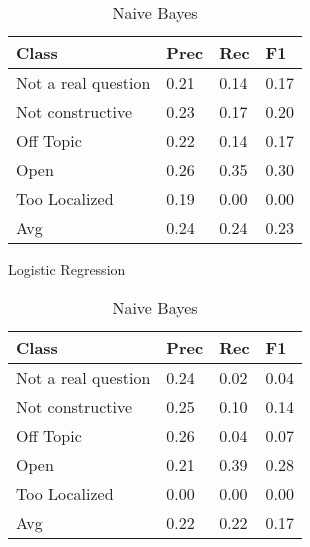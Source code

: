 \begin{table}[!htpb]
\centering
\begin{minipage}{.5\linewidth}
    \begin{tabular}{|l|l|l|l|} \hline
    \textbf{Class}& \textbf{Prec} & \textbf{Rec} & \textbf{F1} \\ \hline
    Not a real question & 0.21      & 0.14   & 0.17    \\
    Not constructive    & 0.23      & 0.17   & 0.20     \\
    Off Topic           & 0.22      & 0.14   & 0.17     \\
    Open                & 0.26      & 0.35   & 0.30     \\
    Too Localized       & 0.19      & 0.00   & 0.00     \\ \hline
    Avg                 & 0.24      & 0.24   & 0.23   \\ \hline  
    \end{tabular}
    \caption{Logistic Regression}
    \label{tab1:lr}
\end{minipage}%
\begin{minipage}{.5\linewidth}
    \begin{tabular}{|l|l|l|l|} \hline
    \textbf{Class}& \textbf{Prec} & \textbf{Rec} & \textbf{F1} \\ \hline
    Not a real question & 0.24      & 0.02   & 0.04     \\
    Not constructive    & 0.25      & 0.10   & 0.14     \\
    Off Topic           & 0.26      & 0.04   & 0.07     \\
    Open                & 0.21      & 0.39   & 0.28     \\
    Too Localized       & 0.00      & 0.00   & 0.00     \\ \hline
    Avg                 & 0.22      & 0.22   & 0.17   \\ \hline  
    \end{tabular}
    \caption{Naive Bayes}
    \label{tab1:nb}
\end{minipage}
\end{table}


